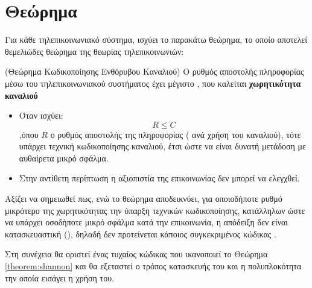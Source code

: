 \en{\lipsum[1]}

\section{Θεώρημα }
Για κάθε τηλεπικοινωνιακό σύστημα, ισχύει το παρακάτω θεώρημα, το οποίο  αποτελεί θεμελιώδες θεώρημα της θεωρίας τηλεπικοινωνιών:
\begin{theorem}(Θεώρημα Κωδικοποίησης Ενθόρυβου Καναλιού)
Ο ρυθμός αποστολής πληροφορίας μέσω του τηλεπικοινωνιακού συστήματος έχει μέγιστο , που καλείται \textbf{χωρητικότητα καναλιού}
\begin{itemize}
\item Όταν ισχύει:
\begin{equation}
R\leq{C}
\end{equation}
,όπου $R$ ο ρυθμός αποστολής της πληροφορίας ( ανά χρήση του καναλιού), τότε υπάρχει τεχνική κωδικοποίησης καναλιού, έτσι ώστε να είναι δυνατή μετάδοση με αυθαίρετα μικρό σφάλμα.
\item Στην αντίθετη περίπτωση η αξιοπιστία της επικοινωνίας δεν μπορεί να ελεγχθεί.
\end{itemize}
\label{theorem:shannon}
\end{theorem}

\en{\lipsum[1]}

Αξίζει να σημειωθεί πως, ενώ το θεώρημα  αποδεικνύει, για οποιοδήποτε ρυθμό μικρότερο της χωρητικότητας την ύπαρξη τεχνικών κωδικοποίησης, κατάλληλων ώστε να υπάρχει οσοδήποτε μικρό σφάλμα κατά την επικοινωνία, η απόδειξη δεν είναι κατασκευαστική (), δηλαδή δεν προτείνεται κάποιος συγκεκριμένος κώδικας \cite{shannon1948mathematical}.

Στη συνέχεια θα οριστεί ένας τυχαίος κώδικας που ικανοποιεί το Θεώρημα \ref{theorem:shannon} και θα εξεταστεί ο τρόπος κατασκευής του και η πολυπλοκότητα την οποία εισάγει η χρήση του.

